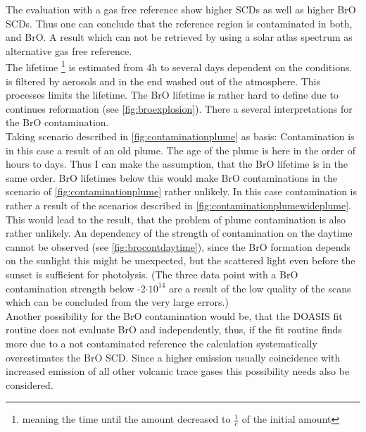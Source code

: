 \documentclass  [
  paper    = a4,
  BCOR     = 10mm,
  twoside,
  fontsize = 12pt,
  fleqn,
  toc      = bibnumbered,
  toc      = listofnumbered,
  numbers  = noendperiod,
  headings = normal,
  listof   = leveldown,
  version  = 3.03
]                                       {scrreprt}
\begin{document}
		The evaluation with a gas free reference show higher  SCDs as well as higher BrO SCDs. Thus one can conclude that the reference region is contaminated in both,  and BrO. A result which can not be retrieved by using a solar atlas spectrum as alternative gas free reference.\\
		The  lifetime \footnote{meaning the time until the amount decreased to $\frac{1}{e}$ of the initial amount} is estimated from 4h to several days dependent on the conditions.  is filtered by aerosols and in the end washed out of the atmosphere. This processes limits the  lifetime.
		The BrO lifetime is rather hard to define due to continues reformation (see \cref{fig:broexplosion}).
		There a several interpretations for the BrO contamination.\\
		Taking scenario described in \cref{fig:contaminationplume} as basis:
		Contamination is in this case a result of an old plume. The age of the plume is here in the order of hours to days. Thus I can make the assumption, that the BrO lifetime is in the same order.
		BrO lifetimes below this would make BrO contaminations in the scenario of \cref{fig:contaminationplume} rather unlikely. In this case contamination is rather a result of the scenarios described in  \cref{fig:contaminationplumewideplume}. This would lead to the result, that the problem of plume contamination is also rather unlikely.
		An dependency of the strength of contamination on the daytime cannot be observed (see \cref{fig:brocontdaytime}), since the BrO formation depends on the sunlight this might be unexpected, but the scattered light even before the sunset is sufficient for  photolysis. (The three data point with a BrO contamination strength below -2$\cdot 10^{14}$ are a result of the low quality of the scans which can be concluded from the very large errors.)\\
		Another possibility for the BrO contamination would be, that the DOASIS fit routine does not evaluate BrO and  independently, thus, if the fit routine finds more  due to a not contaminated reference the calculation systematically overestimates the BrO SCD. Since  a higher  emission usually coincidence with increased emission of all other volcanic trace gases this possibility needs also be considered.


%	
\end{document}
